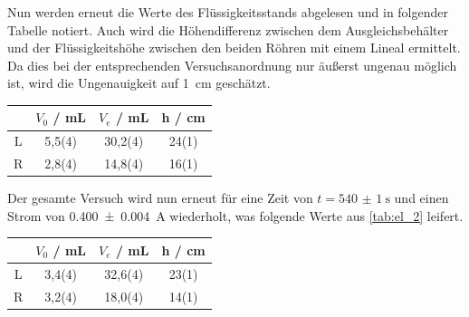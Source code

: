 \documentclass[11pt,ngerman]{scrartcl}
\begin{document}
\vspace{2mm}

Nun werden erneut die Werte des Flüssigkeitsstands abgelesen und in folgender Tabelle notiert. Auch wird die Höhendifferenz zwischen dem Ausgleichsbehälter und der Flüssigkeitshöhe zwischen den beiden Röhren mit einem Lineal ermittelt. Da dies bei der entsprechenden Versuchsanordnung nur äußerst ungenau möglich ist, wird die Ungenauigkeit auf \SI{1}{\cm} geschätzt.

\newpage

\begin{center}
	\begin{tabular}{|c|S[table-format=1.1(1)]|S[table-format=2.1(1)]|S[table-format=2(1)]|} \hline
		  & {$V_{0}$ / mL} & {$V_{e}$ / mL} & {h / cm} \\ \hline
		L & 5,5(4)         & 30,2(4)        & 24(1)    \\ \hline
		R & 2,8(4)         & 14,8(4)        & 16(1)    \\ \hline
	\end{tabular}
	\label{tab:el_1}
\end{center}


Der gesamte Versuch wird nun erneut für eine Zeit von $t=\SI{540(1)}{\s}$ und einen Strom von \SI{0.400(4)}{A} wiederholt, was folgende Werte aus \autoref{tab:el_2} leifert.

\begin{center}
	\begin{tabular}{|c|S[table-format=1.1(1)]|S[table-format=2.1(1)]|S[table-format=2(1)]|} \hline
		  & {$V_{0}$ / mL} & {$V_{e}$ / mL} & {h / cm} \\ \hline
		L & 3,4(4)         & 32,6(4)        & 23(1)    \\ \hline
		R & 3,2(4)         & 18,0(4)        & 14(1)    \\ \hline
	\end{tabular}
	\label{tab:el_2}
\end{center}
\end{document}

